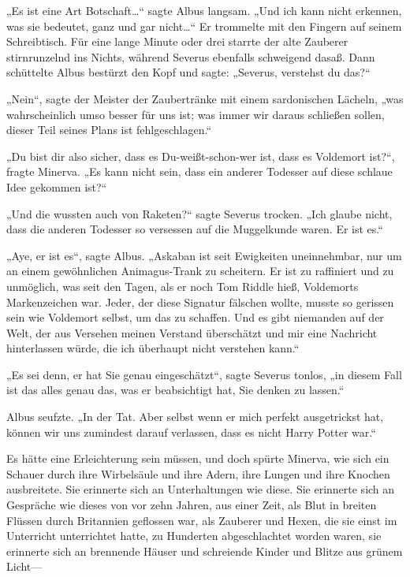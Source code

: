 {„Es ist eine Art Botschaft…“ sagte Albus langsam. „Und ich kann nicht erkennen, was sie bedeutet, ganz und gar nicht…“ Er trommelte mit den Fingern auf seinem Schreibtisch. Für eine lange Minute oder drei starrte der alte Zauberer stirnrunzelnd ins Nichts, während Severus ebenfalls schweigend dasaß. Dann schüttelte Albus bestürzt den Kopf und sagte: „Severus, verstehst du das?“

„Nein“, sagte der Meister der Zaubertränke mit einem sardonischen Lächeln, „was wahrscheinlich umso besser für uns ist; was immer wir daraus schließen sollen, dieser Teil seines Plans ist fehlgeschlagen.“

„Du bist dir also sicher, dass es Du-weißt-schon-wer ist, dass es Voldemort ist?“, fragte Minerva. „Es kann nicht sein, dass ein anderer Todesser auf diese schlaue Idee gekommen ist?“

„Und die wussten auch von Raketen?“ sagte Severus trocken. „Ich glaube nicht, dass die anderen Todesser so versessen auf die Muggelkunde waren. Er ist es.“

„Aye, er ist es“, sagte Albus. „Askaban ist seit Ewigkeiten uneinnehmbar, nur um an einem gewöhnlichen Animagus-Trank zu scheitern. Er ist zu raffiniert und zu unmöglich, was seit den Tagen, als er noch Tom Riddle hieß, Voldemorts Markenzeichen war. Jeder, der diese Signatur fälschen wollte, musste so gerissen sein wie Voldemort selbst, um das zu schaffen. Und es gibt niemanden auf der Welt, der aus Versehen meinen Verstand überschätzt und mir eine Nachricht hinterlassen würde, die ich überhaupt nicht verstehen kann.“

„Es sei denn, er hat Sie genau eingeschätzt“, sagte Severus tonlos, „in diesem Fall ist das alles genau das, was er beabsichtigt hat, Sie denken zu lassen.“

Albus seufzte. „In der Tat. Aber selbst wenn er mich perfekt ausgetrickst hat, können wir uns zumindest darauf verlassen, dass es nicht Harry Potter war.“

Es hätte eine Erleichterung sein müssen, und doch spürte Minerva, wie sich ein Schauer durch ihre Wirbelsäule und ihre Adern, ihre Lungen und ihre Knochen ausbreitete. Sie erinnerte sich an Unterhaltungen wie diese. Sie erinnerte sich an Gespräche wie dieses von vor zehn Jahren, aus einer Zeit, als Blut in breiten Flüssen durch Britannien geflossen war, als Zauberer und Hexen, die sie einst im Unterricht unterrichtet hatte, zu Hunderten abgeschlachtet worden waren, sie erinnerte sich an brennende Häuser und schreiende Kinder und Blitze aus grünem Licht—

}
